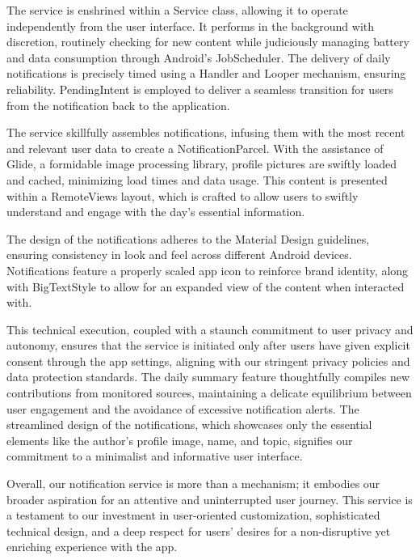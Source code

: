 The service is enshrined within a Service class, allowing it to operate independently from the user interface. It performs in the background with discretion, routinely checking for new content while judiciously managing battery and data consumption through Android's JobScheduler. The delivery of daily notifications is precisely timed using a Handler and Looper mechanism, ensuring reliability. PendingIntent is employed to deliver a seamless transition for users from the notification back to the application.

The service skillfully assembles notifications, infusing them with the most recent and relevant user data to create a NotificationParcel. With the assistance of Glide, a formidable image processing library, profile pictures are swiftly loaded and cached, minimizing load times and data usage. This content is presented within a RemoteViews layout, which is crafted to allow users to swiftly understand and engage with the day's essential information.

The design of the notifications adheres to the Material Design guidelines, ensuring consistency in look and feel across different Android devices. Notifications feature a properly scaled app icon to reinforce brand identity, along with BigTextStyle to allow for an expanded view of the content when interacted with.

This technical execution, coupled with a staunch commitment to user privacy and autonomy, ensures that the service is initiated only after users have given explicit consent through the app settings, aligning with our stringent privacy policies and data protection standards. The daily summary feature thoughtfully compiles new contributions from monitored sources, maintaining a delicate equilibrium between user engagement and the avoidance of excessive notification alerts. The streamlined design of the notifications, which showcases only the essential elements like the author's profile image, name, and topic, signifies our commitment to a minimalist and informative user interface.

Overall, our notification service is more than a mechanism; it embodies our broader aspiration for an attentive and uninterrupted user journey. This service is a testament to our investment in user-oriented customization, sophisticated technical design, and a deep respect for users' desires for a non-disruptive yet enriching experience with the app.

